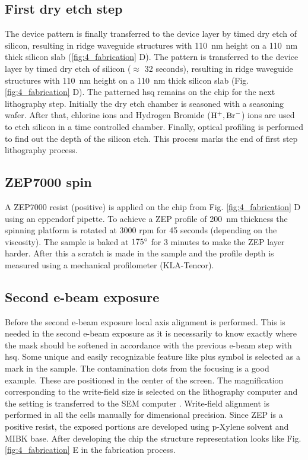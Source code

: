 \documentclass[../report.tex]{subfiles}
\begin{document}
\subsection{First dry etch step}
The device pattern is finally transferred to the device layer by timed dry etch of silicon, resulting in ridge waveguide structures with \SI{110}{\nano \meter} height on a \SI{110}{\nano \meter} thick silicon slab (\ref{fig:4_fabrication} D). The pattern is transferred to the device layer by timed dry etch of silicon ($\approx$ 32 seconds), resulting in ridge waveguide structures with \SI{110}{\nano \meter} height on a \SI{110}{\nano \meter} thick silicon slab (Fig. \ref{fig:4_fabrication} D). The patterned \gls{hsq} remains on the chip for the next lithography step. Initially the dry etch chamber is seasoned with a seasoning wafer. After that, chlorine ions and Hydrogen Bromide ($\mathrm{H^{+}, Br^{-}}$) ions are used to etch silicon in a time controlled chamber. Finally, optical profiling is performed to find out the depth of the silicon etch. This process marks the end of first step lithography process.

\subsection{ZEP7000 spin}
A ZEP7000 resist (positive) is applied on the chip from Fig. \ref{fig:4_fabrication} D using an eppendorf pipette. To achieve a ZEP profile of \SI{200}{\nano \meter} thickness the spinning platform is rotated at 3000 rpm for 45 seconds (depending on the viscosity). The sample is baked at $\mathrm{175^{\circ}}$ for 3 minutes to make the ZEP layer harder. After this a scratch is made in the sample and the profile depth is measured using a mechanical profilometer (KLA-Tencor).

\subsection{Second e-beam exposure}
Before the second e-beam exposure local axis alignment is performed. This is needed in the second e-beam exposure as it is necessarily to know exactly where the mask should be softened in accordance with the previous e-beam step with \gls{hsq}. Some unique and easily recognizable feature like plus symbol is selected as a mark in the sample. The contamination dots from the focusing is a good example. These are positioned in the center of the screen. The magnification corresponding to the write-field size is selected on the lithography computer and the setting is transferred to the SEM computer \cite{write_field}. Write-field alignment is performed in all the cells manually for dimensional precision. Since ZEP is a positive resist, the exposed portions are developed using p-Xylene solvent and MIBK base. After developing the chip the structure representation looks like Fig. \ref{fig:4_fabrication} E in the fabrication process.
\end{document}
